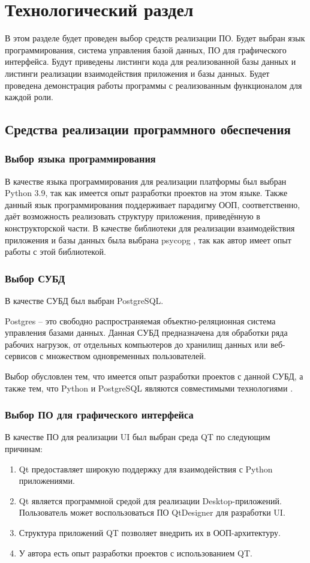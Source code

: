 \section{Технологический раздел}
В этом разделе будет проведен выбор средств реализации ПО.
Будет выбран язык программирования, система управления базой данных, ПО для графического интерфейса.
Будут приведены листинги кода для реализованной базы данных и листинги реализации взаимодействия приложения и базы данных.
Будет проведена демонстрация работы программы с реализованным функционалом для каждой роли.

\subsection{Средства реализации программного обеспечения}
\subsubsection{Выбор языка программирования}
В качестве языка программирования для реализации платформы был выбран Python 3.9, так как имеется опыт разработки проектов на этом языке. 
Также данный язык программирования поддерживает парадигму ООП, соответственно, даёт возможность реализовать структуру приложения, приведённую в конструкторской части.
В качестве библиотеки для реализации взаимодействия приложения и базы данных была выбрана psycopg \cite{psycopg2}, так как автор имеет опыт работы с этой библиотекой.

\subsubsection{Выбор СУБД}
В качестве СУБД был выбран PostgreSQL.

Postgres \cite{postgresql} -- это свободно распространяемая объектно-реляционная система управления базами данных.
Данная СУБД предназначена для обработки ряда рабочих нагрузок, от отдельных компьютеров до хранилищ данных или веб-сервисов с множеством одновременных пользователей. 

Выбор обусловлен тем, что имеется опыт разработки проектов с данной СУБД, а также тем, что Python и PostgreSQL являются совместимыми технологиями  \cite{psycopg2}.

\subsubsection{Выбор ПО для графического интерфейса}
В качестве ПО для реализации UI был выбран среда QT по следующим причинам:
\begin{enumerate}
	\item Qt предоставляет широкую поддержку для взаимодействия с Python приложениями.
	\item Qt является программной средой для реализации Desktop-приложений. Пользователь может воспользоваться ПО QtDesigner для разработки UI.
	\item Структура приложений QT позволяет внедрить их в ООП-архитектуру.
	\item У автора есть опыт разработки проектов с использованием QT.
\end{enumerate} 

